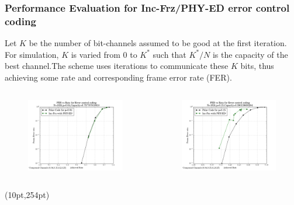 \documentclass[xcolor=dvipsnames]{beamer}
\newcommand\hyperback[1]{%
  \begin{textblock*}{\paperwidth}(10pt,254pt)
    \raggedright #1\hspace{.5em}
  \end{textblock*}}
\begin{document}
\begin{frame}[label=pch1]
\frametitle{Performance Evaluation for Inc-Frz/PHY-ED error control coding}
Let $K$ be the number of bit-channels assumed to be good at the first iteration. For simulation, $K$ is varied from $0$ to $K^*$ such that $K^*/N$ is the capacity of the best channel.The scheme uses iterations to communicate these $K$ bits, thus achieving some rate and corresponding frame error rate (FER).
\begin{minipage}[1.1\textheight]{\textwidth}
\begin{columns}
\begin{column}{0.5\textwidth}
\begin{figure}
\centering
\includegraphics[width=6cm]{./FER_channel0p04.png}
\end{figure}
\end{column}
\begin{column}{0.5\textwidth}
\begin{figure}
\centering
\includegraphics[width=6cm]{./FER_channel0p15.png}
\end{figure}
\end{column}
\end{columns}
\end{minipage}
\hyperback{\hyperlink{psw1}{}}
\end{frame}
\end{document}
